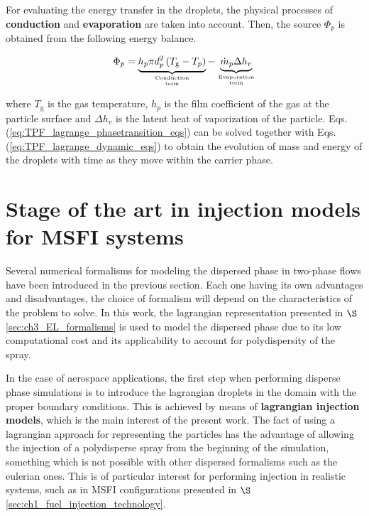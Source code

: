 For evaluating the energy transfer in the droplets, the physical processes of \textbf{conduction} and  \textbf{evaporation} are taken into account. Then, the source $\Phi_p$ is obtained from the following energy balance.

\begin{equation}
\Phi_p = \underbrace{ h_p \pi d_p^2 \left( T_\mathrm{g} - T_p \right) }_{\text{Conduction}\atop\text{term}} - \underbrace{ \dot{m}_p  \Delta h_v }_{\text{Evaporation}\atop\text{term}}
\end{equation}

where $T_\mathrm{g}$ is the gas temperature, $h_p$ is the film coefficient of the gas at the particle surface and $\Delta h_v$ is the latent heat of vaporization of the particle. Eqs. (\ref{eq:TPF_lagrange_phasetransition_eqs}) can be solved together with Eqs. (\ref{eq:TPF_lagrange_dynamic_eqs}) to obtain the evolution of mass and energy of the droplets with time as they move within the carrier phase.

\section{Stage of the art in injection models for MSFI systems}
\label{sec:ch3_state_art_lagrangian_injection}

Several numerical formalisms for modeling the dispersed phase in two-phase flows have been introduced in the previous section. Each one having its own advantages and disadvantages, the choice of formalism will depend on the characteristics of the problem to solve. In this work, the lagrangian representation presented in $\S$\ref{sec:ch3_EL_formalisms} is used to model the dispersed phase due to its low computational cost and its applicability to account for polydispersity of the spray.%

In the case of aerospace applications, the first step when performing disperse phase simulations is to introduce the lagrangian droplets in the domain with the proper boundary conditions. This is achieved by means of \textbf{lagrangian injection models}, which is the main interest of the present work. The fact of using a lagrangian approach for representing the particles has the advantage of allowing the injection of a polydisperse spray from the beginning of the simulation, something which is not possible with other dispersed formalisms such as the eulerian ones. This is of particular interest for performing injection in realistic systems, such as in MSFI configurations presented in $\S$\ref{sec:ch1_fuel_injection_technology}. 

